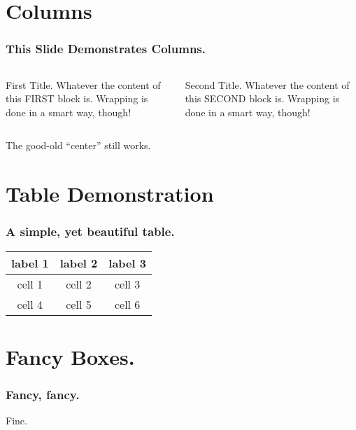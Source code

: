 \documentclass[12pt]{beamer}            %
\begin{document}
\section{Columns}
\begin{frame}
    \frametitle{This Slide Demonstrates Columns.}

    \begin{columns}
        \begin{column}[]{.5\textwidth}
            \begin{block}{First Title.}
                Whatever the content of this FIRST block is. Wrapping is done in a smart way, though!
            \end{block}
        \end{column}

        \begin{column}[]{.5\textwidth}
            \begin{block}{Second Title.}
                Whatever the content of this SECOND block is. Wrapping is done in a smart way, though!
            \end{block}
        \end{column}
    \end{columns}

    \begin{center}
        The good-old ``center'' still works.
    \end{center}
\end{frame}

\section{Table Demonstration}
\begin{frame}
    \frametitle{A simple, yet beautiful table.}
    \begin{center}
        \begin{tabular}{c|c|c}
            \toprule
            label 1 & label 2 & label 3 \\
            \midrule
            cell 1 & cell 2 & cell 3 \\
            cell 4 & cell 5 & cell 6 \\
            \bottomrule
        \end{tabular}
    \end{center}
\end{frame}

\section{Fancy Boxes.}
\begin{frame}
    \frametitle{Fancy, fancy.}
\end{frame}

\begin{frame}
    Fine.
\end{frame}
\end{document}
